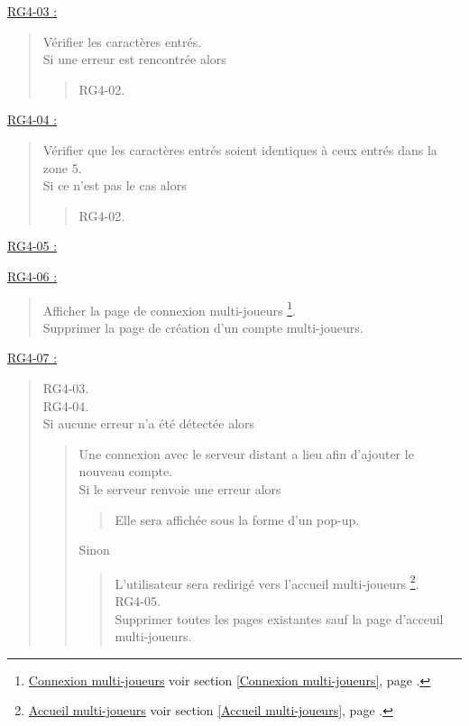 \documentclass{report}
\begin{document}
			\underline{RG4-03 :}
				\begin{quote}
					Vérifier les caractères entrés.\\
					Si une erreur est rencontrée alors
					\begin{quote}
						RG4-02.
					\end{quote}
				\end{quote}
				
			\underline{RG4-04 :}
				\begin{quote}
					Vérifier que les caractères entrés soient identiques à ceux entrés dans la zone 5.\\
					Si ce n'est pas le cas alors
					\begin{quote}
						RG4-02.
					\end{quote}					
				\end{quote}	
				
			\underline{RG4-05 :}
				\begin{quote}
					
				\end{quote}
				
			\underline{RG4-06 :}
				\begin{quote}
					Afficher la page de connexion multi-joueurs%
						\footnote[1]{
							\hyperlink{Connexion multi-joueurs}{Connexion multi-joueurs}
							\og voir section \ref{Connexion multi-joueurs}, page \pageref{Connexion multi-joueurs}.\fg
						}.\\
					Supprimer la page de création d'un compte multi-joueurs.\\
				\end{quote}

			\underline{RG4-07 :}
				\begin{quote}
					RG4-03.\\
					RG4-04.\\
					Si aucune erreur n'a été détectée alors
						\begin{quote}
							Une connexion avec le serveur distant a lieu afin d'ajouter le nouveau compte.\\
							Si le serveur renvoie une erreur alors \\
							\begin{quote}
								Elle sera affichée sous la forme d'un pop-up.
							\end{quote}	
							Sinon
							\begin{quote}
								L'utilisateur sera redirigé vers l'accueil multi-joueurs%
								\footnote[2]{
									\hyperlink{Accueil multi-joueurs}{Accueil multi-joueurs}
									\og voir section \ref{Accueil multi-joueurs}, page \pageref{Accueil multi-joueurs}.\fg
								}.\\
								RG4-05.\\
								Supprimer toutes les pages existantes sauf la page d'acceuil multi-joueurs\footnotemark[2].					
							\end{quote}
						\end{quote}
				\end{quote}
	
\end{document}
